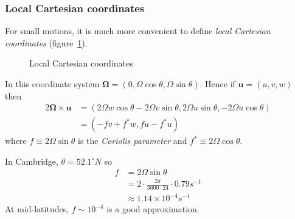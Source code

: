 \documentclass{jknotes}
\begin{document}
\subsubsection{Local Cartesian coordinates}
For small motions, it is much more convenient to define \emph{local Cartesian
coordinates} (figure~\ref{fig:lcc}).
\begin{figure}
	\begin{center}
	\caption{Local Cartesian coordinates}
	\label{fig:lcc}
	\end{center}
\end{figure}

In this coordinate system $\symbf{\Omega} = (0, \Omega \cos \theta, \Omega \sin
\theta)$. Hence if $\symbf{u} = (u, v, w)$ then
\begin{equation}
	\begin{aligned}
		2 \symbf{\Omega} \times \symbf{u} &= (2\Omega w \cos \theta - 2 \Omega v \sin
		\theta, 2 \Omega u \sin \theta, -2\Omega u \cos \theta) \\
		&= (-fv + f^* w, fu - f^* u)
	\end{aligned}
\end{equation}
where $f \equiv 2 \Omega \sin \theta$ is the \emph{Coriolis parameter} and
$f^* \equiv 2 \Omega \cos \theta$.

\begin{eg}
	In Cambridge, $\theta = 52.1^{\circ} N$ so
	\begin{equation}
		\begin{aligned}
			f &= 2 \Omega \sin \theta \\
			  &= 2 \cdot \frac{2\pi}{3600 \cdot 24} \cdot 0.79 s^{-1} \\
			  &\approx 1.14 \times 10^{-4} s^{-1}
		\end{aligned}
	\end{equation}
	At mid-latitudes, $f \sim 10^{-4}$ is a good approximation.
\end{eg}
\end{document}
